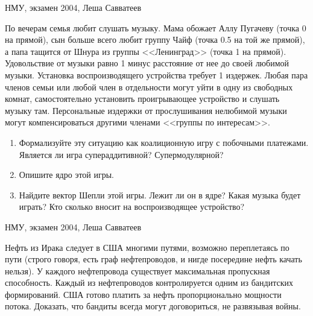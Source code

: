 \begin{problem}
\begin{source}
НМУ, экзамен 2004, Леша Савватеев
\end{source}
 По вечерам семья любит слушать музыку. Мама обожает Аллу Пугачеву (точка 0 на прямой), сын больше всего любит группу Чайф (точка 0.5 на той же прямой), а папа тащится от Шнура из группы <<Ленинград>> (точка 1 на прямой). Удовольствие от музыки равно 1 минус расстояние от нее до своей любимой музыки.
Установка воспроизводящего устройства требует 1 издержек. Любая пара членов семьи или любой член в отдельности могут уйти в одну из свободных комнат, самостоятельно установить проигрывающее устройство и слушать музыку там. Персональные издержки от прослушивания нелюбимой музыки могут компенсироваться другими членами <<группы по интересам>>.
\begin{enumerate}
\item Формализуйте эту ситуацию как коалиционную игру с побочными платежами. Является ли игра супераддитивной? Супермодулярной?
\item Опишите ядро этой игры.
\item Найдите вектор Шепли этой игры. Лежит ли он в ядре? Какая музыка будет играть? Кто сколько вносит на воспроизводящее устройство?
\end{enumerate}


\begin{sol}

\end{sol}
\end{problem}




\begin{problem}
\begin{source}
НМУ, экзамен 2004, Леша Савватеев
\end{source}
 Нефть из Ирака следует в США многими путями, возможно переплетаясь по пути (строго говоря, есть граф нефтепроводов, и нигде посередине нефть качать нельзя). У каждого нефтепровода существует максимальная пропускная способность. Каждый из нефтепроводов контролируется одним из бандитских формирований. США готово платить за нефть пропорционально мощности потока. Доказать, что бандиты всегда могут договориться, не развязывая войны.






\begin{sol}

\end{sol}
\end{problem}




